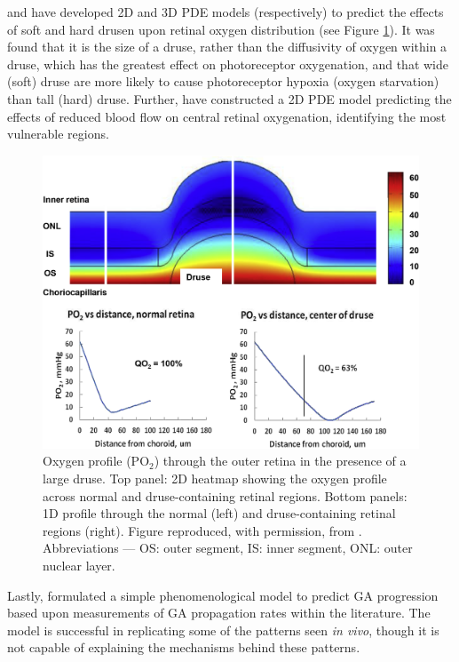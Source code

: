\documentclass{article}
\begin{document}
\citet{Linsenmeier_and_Zhang_2017} and \citet{McHugh_et_al_2019} have developed 2D and 3D PDE models (respectively) to predict the effects of soft and hard drusen upon retinal oxygen distribution (see Figure \ref{Fig_LinZhang2017}). It was found that it is the size of a druse, rather than the diffusivity of oxygen within a druse, which has the greatest effect on photoreceptor oxygenation, and that wide (soft) druse are more likely to cause photoreceptor hypoxia (oxygen starvation) than tall (hard) druse. Further, \citet{Vercellin_et_al_2021} have constructed a 2D PDE model predicting the effects of reduced blood flow on central retinal oxygenation, identifying the most vulnerable regions.
%
\begin{figure}
\begin{center}
\includegraphics[scale=0.9]{Linsenmeier__and_Zhang_2017_Fig_21}
\end{center}
\caption{Oxygen profile (PO$_2$) through the outer retina in the presence of a large druse. Top panel: 2D heatmap showing the oxygen profile across normal and druse-containing retinal regions. Bottom panels: 1D profile through the normal (left) and druse-containing retinal regions (right). Figure reproduced, with permission, from \citet{Linsenmeier_and_Zhang_2017}. Abbreviations --- OS: outer segment, IS: inner segment, ONL: outer nuclear layer.}
\label{Fig_LinZhang2017}
\end{figure}
%

Lastly, \citet{Shen_et_al_2020} formulated a simple phenomenological model to predict GA progression based upon measurements of GA propagation rates within the literature. The model is successful in replicating some of the patterns seen \emph{in vivo}, though it is not capable of explaining the mechanisms behind these patterns.
%
%
\end{document}
